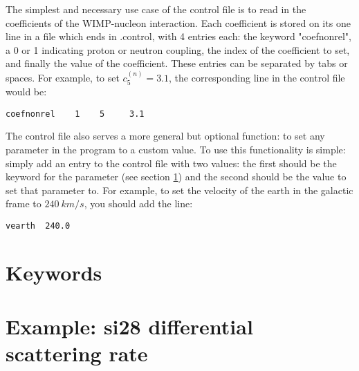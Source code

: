 \documentclass[11pt]{amsart}
\begin{document}
The simplest and necessary use case of the control file is to read in the coefficients of the WIMP-nucleon interaction. Each coefficient is stored on its one line in a file which ends in .control, with 4 entries each: the keyword "coefnonrel", a 0 or 1 indicating proton or neutron coupling, the index of the coefficient to set, and finally the value of the coefficient. These entries can be separated by tabs or spaces. For example, to set $c_5^{(n)}=3.1$, the corresponding line in the control file would be:
\begin{verbatim}
coefnonrel    1    5     3.1
\end{verbatim}

The control file also serves a more general but optional function: to set any parameter in the program to a custom value. To use this functionality is simple: simply add an entry to the control file with two values: the first should be the keyword for the parameter (see section \ref{keywords}) and the second should be the value to set that parameter to. For example, to set the velocity of the earth in the galactic frame to $240\ km/s$, you should add the line:
\begin{verbatim}
vearth  240.0
\end{verbatim}

\section{Keywords}\label{keywords}

\section{Example: si28 differential scattering rate}
\end{document}
